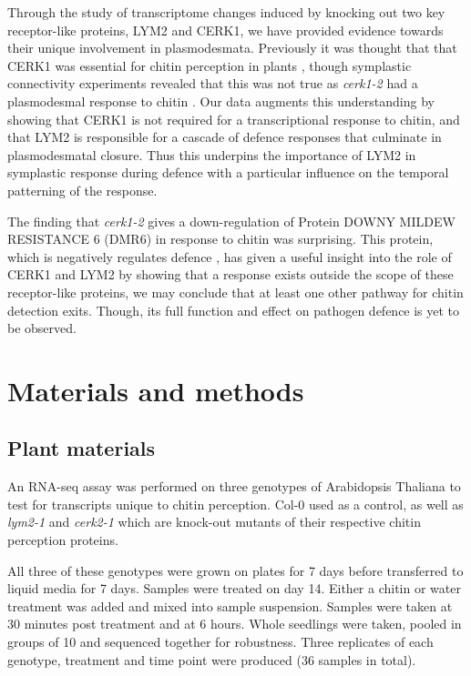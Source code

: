 \documentclass[../main.tex]{subfiles}
\begin{document}
Through the study of transcriptome changes induced by knocking out two key
receptor-like proteins, LYM2 and CERK1, we have provided evidence towards their
unique involvement in plasmodesmata. Previously it was thought that that CERK1
was essential for chitin perception in plants \cite{miyaCERK1LysMReceptor2007},
though symplastic connectivity experiments revealed that this was not true as
\textit{cerk1-2} had a plasmodesmal response to chitin \cite{Faulkner2013}.
Our data augments this understanding by showing that CERK1 is not required for a
transcriptional response to chitin, and that LYM2 is responsible for a cascade
of defence responses that culminate in plasmodesmatal closure. Thus this
underpins the importance of LYM2 in symplastic response during defence with a
particular influence on the temporal patterning of the response. 

The finding that \textit{cerk1-2} gives a down-regulation of  Protein DOWNY
MILDEW RESISTANCE 6 (DMR6) in response to chitin was surprising. This protein,
which is negatively regulates defence \cite{zeilmakerDOWNYMILDEWRESISTANT2015},
has given a useful insight into the role of CERK1 and LYM2 by showing that a
response exists outside the scope of these receptor-like proteins, we may
conclude that at least one other pathway for chitin detection exits. Though,
its full function and effect on pathogen defence is yet to be observed.



\section{Materials and methods}

\subsection{Plant materials}
An RNA-seq assay was performed on three genotypes of Arabidopsis Thaliana to
test for transcripts unique to chitin perception. Col-0 used as a control,
as well as \textit{lym2-1} and \textit{cerk2-1} which are knock-out mutants of
their respective chitin perception proteins. 

All three of these genotypes were grown on plates for 7 days before transferred
to liquid media for 7 days. Samples were treated on day 14. Either a chitin or
water treatment was added and mixed into sample suspension. Samples were taken
at 30 minutes post treatment and at 6 hours. Whole seedlings were taken, pooled
in groups of 10 and sequenced together for robustness. Three replicates of each
genotype, treatment and time point were produced (36 samples in total).
\end{document}
